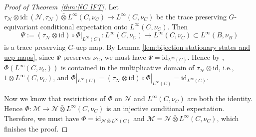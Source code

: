 \documentclass[12pt]{amsart}
\newcommand{\cM}{{\mathcal M}}
\newcommand{\cN}{{\mathcal N}}
\def\id {\mathrm{id}}
\theoremstyle{definition}
\begin{document}
\begin{proof}[Proof of Theorem~\ref{thm:NC IFT}]
Let $\tau_\cN\otimes \id: (\cN,\tau_\cN)\bar{\otimes} L^\infty(C,\nu_C)\to L^\infty(C,\nu_C)$ be the trace preserving $G$-equivariant conditional expectation onto $L^\infty(C,\nu_C)$. Then 
$$\Psi:=(\tau_\cN\otimes \id)\circ\Phi|_{L^\infty(C)}:L^\infty(C,\nu_C)\to L^\infty(C,\nu_C)\subset L^\infty(B,\nu_B)$$ 
is a trace preserving $G$-ucp map. By Lemma \ref{lem:bijection stationary states and ucp maps}, since $\Psi$ preserves $\nu_C$, we must have $\Psi=\id_{L^\infty(C)}$. Hence by \cite[Lemma 2.2]{zhou2024noncommutative}, $\Phi(L^\infty(C,\nu_C))$ is contained in the multiplicative domain of $\tau_\cN\otimes \id$, i.e., $1\otimes L^\infty(C,\nu_C)$, and $\Phi|_{L^\infty(C)}=(\tau_\cN\otimes \id)\circ\Phi|_{L^\infty(C)}=\id_{L^\infty(C)}$.

Now we know that restrictions of $\Phi$ on $\cN$ and $L^\infty(C,\nu_C)$ are both the identity. Hence $\Phi:\cM\to\cN\bar{\otimes} L^\infty(C,\nu_C)$ is an injective conditional expectation. Therefore, we must have $\Phi=\id_{\cN\bar{\otimes} L^\infty(C)}$ and $\cM=\cN\bar{\otimes} L^\infty(C,\nu_C)$, which finishes the proof.
\end{proof}
\end{document}
